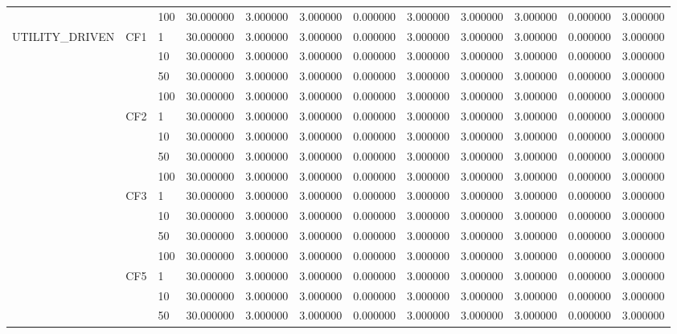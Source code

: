 \begin{tabular}{lllrrrrrrrrr}
 &  & 100 & 30.000000 & 3.000000 & 3.000000 & 0.000000 & 3.000000 & 3.000000 & 3.000000 & 0.000000 & 3.000000 \\
\cline{1-12} \cline{2-12}
\multirow[t]{16}{*}{UTILITY_DRIVEN} & \multirow[t]{4}{*}{CF1} & 1 & 30.000000 & 3.000000 & 3.000000 & 0.000000 & 3.000000 & 3.000000 & 3.000000 & 0.000000 & 3.000000 \\
 &  & 10 & 30.000000 & 3.000000 & 3.000000 & 0.000000 & 3.000000 & 3.000000 & 3.000000 & 0.000000 & 3.000000 \\
 &  & 50 & 30.000000 & 3.000000 & 3.000000 & 0.000000 & 3.000000 & 3.000000 & 3.000000 & 0.000000 & 3.000000 \\
 &  & 100 & 30.000000 & 3.000000 & 3.000000 & 0.000000 & 3.000000 & 3.000000 & 3.000000 & 0.000000 & 3.000000 \\
\cline{2-12}
 & \multirow[t]{4}{*}{CF2} & 1 & 30.000000 & 3.000000 & 3.000000 & 0.000000 & 3.000000 & 3.000000 & 3.000000 & 0.000000 & 3.000000 \\
 &  & 10 & 30.000000 & 3.000000 & 3.000000 & 0.000000 & 3.000000 & 3.000000 & 3.000000 & 0.000000 & 3.000000 \\
 &  & 50 & 30.000000 & 3.000000 & 3.000000 & 0.000000 & 3.000000 & 3.000000 & 3.000000 & 0.000000 & 3.000000 \\
 &  & 100 & 30.000000 & 3.000000 & 3.000000 & 0.000000 & 3.000000 & 3.000000 & 3.000000 & 0.000000 & 3.000000 \\
\cline{2-12}
 & \multirow[t]{4}{*}{CF3} & 1 & 30.000000 & 3.000000 & 3.000000 & 0.000000 & 3.000000 & 3.000000 & 3.000000 & 0.000000 & 3.000000 \\
 &  & 10 & 30.000000 & 3.000000 & 3.000000 & 0.000000 & 3.000000 & 3.000000 & 3.000000 & 0.000000 & 3.000000 \\
 &  & 50 & 30.000000 & 3.000000 & 3.000000 & 0.000000 & 3.000000 & 3.000000 & 3.000000 & 0.000000 & 3.000000 \\
 &  & 100 & 30.000000 & 3.000000 & 3.000000 & 0.000000 & 3.000000 & 3.000000 & 3.000000 & 0.000000 & 3.000000 \\
\cline{2-12}
 & \multirow[t]{4}{*}{CF5} & 1 & 30.000000 & 3.000000 & 3.000000 & 0.000000 & 3.000000 & 3.000000 & 3.000000 & 0.000000 & 3.000000 \\
 &  & 10 & 30.000000 & 3.000000 & 3.000000 & 0.000000 & 3.000000 & 3.000000 & 3.000000 & 0.000000 & 3.000000 \\
 &  & 50 & 30.000000 & 3.000000 & 3.000000 & 0.000000 & 3.000000 & 3.000000 & 3.000000 & 0.000000 & 3.000000 \\

\end{tabular}
